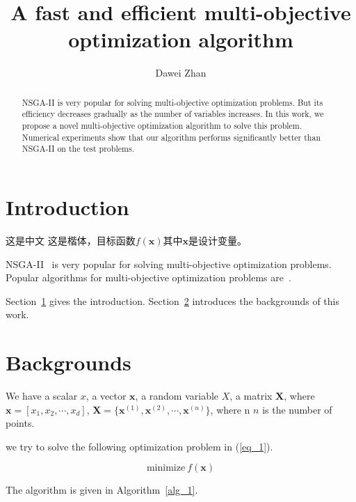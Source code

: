 \documentclass{IEEEtran}
\newcommand{\song}{\CJKfamily{song}}
\newcommand{\kai}{\CJKfamily{kai}}
\begin{document}
\title{A fast and efficient multi-objective optimization algorithm}
\author{Dawei Zhan}
\maketitle

\begin{abstract}
NSGA-II is very popular for solving multi-objective optimization problems. But its efficiency  decreases gradually as the number of variables increases. In this work, we propose a novel multi-objective optimization algorithm to solve this problem. Numerical experiments show that our algorithm performs significantly better than NSGA-II on the test problems.
\end{abstract}




\section{Introduction}
\label{section_introduction}

\song 这是中文 \kai 这是楷体，目标函数$f(\bm{x})$其中$\bm{x}$是设计变量。

NSGA-II~\cite{Deb_2002} is very popular for solving multi-objective optimization problems. Popular algorithms for multi-objective optimization problems are~\cite{Deb_2002,Zhang_2007,Deb_2014}.


Section~\ref{section_introduction} gives the introduction. Section~\ref{section_background} introduces the backgrounds of this work.



\section{Backgrounds}
\label{section_background}

We have a scalar $x$, a vector $\bm{x}$, a random variable $X$, a matrix $\bm{X}$, where $\bm{x} = [x_1,x_2,\cdots,x_d]$, $\bm{X} = \{\bm{x}^{(1)},\bm{x}^{(2)},\cdots,\bm{x}^{(n)}\}$, where n $n$ is the number of points.

we try to solve the following optimization problem in (\ref{eq_1}).

\begin{equation}
\label{eq_1}
	\text{minimize}~ f(\bm{x})
\end{equation}



The algorithm is given in Algorithm~\ref{alg_1}.
\end{document}
